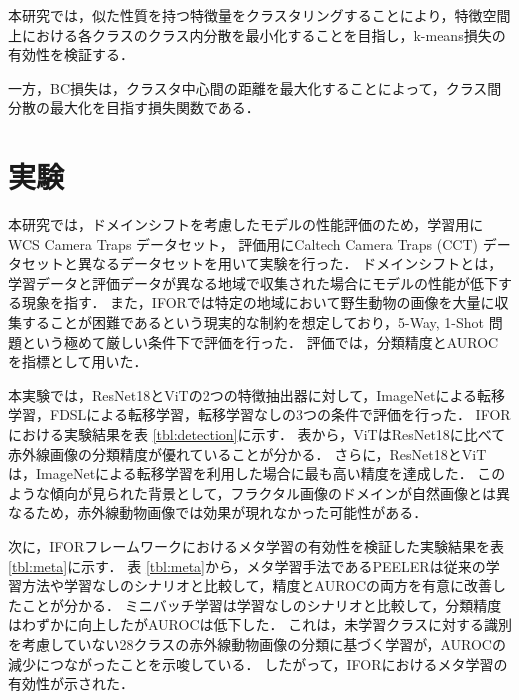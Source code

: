 \documentclass[uplatex,dvipdfmx,10pt,twocolumn]{jsarticle}
\begin{document}
本研究では，似た性質を持つ特徴量をクラスタリングすることにより，特徴空間上における各クラスのクラス内分散を最小化することを目指し，k-means損失の有効性を検証する．

一方，BC損失は，クラスタ中心間の距離を最大化することによって，クラス間分散の最大化を目指す損失関数である．

\section{実験}

本研究では，ドメインシフトを考慮したモデルの性能評価のため，学習用にWCS Camera Traps データセット，
評価用にCaltech Camera Traps (CCT) データセットと異なるデータセットを用いて実験を行った．
ドメインシフトとは，学習データと評価データが異なる地域で収集された場合にモデルの性能が低下する現象を指す．
また，IFORでは特定の地域において野生動物の画像を大量に収集することが困難であるという現実的な制約を想定しており，5-Way, 1-Shot 問題という極めて厳しい条件下で評価を行った．
評価では，分類精度とAUROCを指標として用いた．

本実験では，ResNet18とViTの2つの特徴抽出器に対して，ImageNetによる転移学習，FDSLによる転移学習，転移学習なしの3つの条件で評価を行った．
IFORにおける実験結果を表 \ref{tbl:detection}に示す．
表から，ViTはResNet18に比べて赤外線画像の分類精度が優れていることが分かる．
さらに，ResNet18とViTは，ImageNetによる転移学習を利用した場合に最も高い精度を達成した．
このような傾向が見られた背景として，フラクタル画像のドメインが自然画像とは異なるため，赤外線動物画像では効果が現れなかった可能性がある．

次に，IFORフレームワークにおけるメタ学習の有効性を検証した実験結果を表 \ref{tbl:meta}に示す．
表 \ref{tbl:meta}から，メタ学習手法であるPEELERは従来の学習方法や学習なしのシナリオと比較して，精度とAUROCの両方を有意に改善したことが分かる．
ミニバッチ学習は学習なしのシナリオと比較して，分類精度はわずかに向上したがAUROCは低下した．
これは，未学習クラスに対する識別を考慮していない28クラスの赤外線動物画像の分類に基づく学習が，AUROCの減少につながったことを示唆している．
したがって，IFORにおけるメタ学習の有効性が示された．
\end{document}

